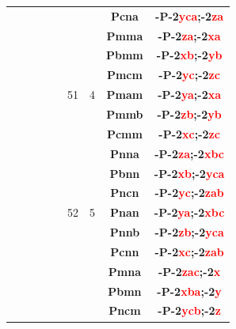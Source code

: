 \documentclass{article}      %
\begin{document}
\begin{small}
\begin{longtable}[c]{|c|c|c|c|c|c|c|c|c|}
          &  & & & &  & &\textbf{Pcna}         &\textbf{-P-2\textcolor{red}{yca};-2\textcolor{red}{za}}\\\cline{6-9}    
          &  & & & &  & &\textbf{Pmma}         &\textbf{-P-2\textcolor{red}{za};-2\textcolor{red}{xa}}\\\cline{8-9}       
          &  & & & &  & &\textbf{Pbmm}         &\textbf{-P-2\textcolor{red}{xb};-2\textcolor{red}{yb}}\\\cline{8-9}       
          &  & & & &  & &\textbf{Pmcm}         &\textbf{-P-2\textcolor{red}{yc};-2\textcolor{red}{zc}}\\\cline{8-9}       
	  &  & & & &\textrm{51}  &\textrm{4} &\textbf{Pmam}         &\textbf{-P-2\textcolor{red}{ya};-2\textcolor{red}{xa}}\\\cline{8-9}       
          &  & & & &  & &\textbf{Pmmb}         &\textbf{-P-2\textcolor{red}{zb};-2\textcolor{red}{yb}}\\\cline{8-9}       
          &  & & & &  & &\textbf{Pcmm}         &\textbf{-P-2\textcolor{red}{xc};-2\textcolor{red}{zc}}\\\cline{6-9}       
          &  & & & &  & &\textbf{Pnna}         &\textbf{-P-2\textcolor{red}{za};-2\textcolor{red}{xbc}}\\\cline{8-9}      
          &  & & & &  & &\textbf{Pbnn}         &\textbf{-P-2\textcolor{red}{xb};-2\textcolor{red}{yca}}\\\cline{8-9}      
          &  & & & &  & &\textbf{Pncn}         &\textbf{-P-2\textcolor{red}{yc};-2\textcolor{red}{zab}}\\\cline{8-9}      
	  &  & & & &\textrm{52}  &\textrm{5} &\textbf{Pnan}         &\textbf{-P-2\textcolor{red}{ya};-2\textcolor{red}{xbc}}\\\cline{8-9}      
          &  & & & &  & &\textbf{Pnnb}         &\textbf{-P-2\textcolor{red}{zb};-2\textcolor{red}{yca}}\\\cline{8-9}      
          &  & & & &  & &\textbf{Pcnn}         &\textbf{-P-2\textcolor{red}{xc};-2\textcolor{red}{zab}}\\\cline{6-9}      
          &  & & & &  & &\textbf{Pmna}         &\textbf{-P-2\textcolor{red}{zac};-2\textcolor{red}{x}}\\\cline{8-9}       
          &  & & & &  & &\textbf{Pbmn}         &\textbf{-P-2\textcolor{red}{xba};-2\textcolor{red}{y}}\\\cline{8-9}       
          &  & & & &  & &\textbf{Pncm}         &\textbf{-P-2\textcolor{red}{ycb};-2\textcolor{red}{z}}\\\cline{8-9}       

\end{longtable}
\end{small}
\end{document}
